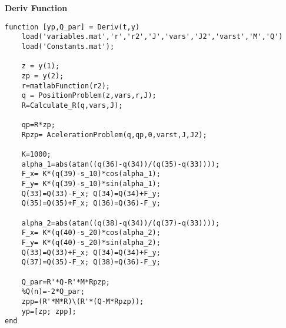 \textbf{Deriv Function}
\begin{lstlisting}[style=codematlab]
function [yp,Q_par] = Deriv(t,y)
	load('variables.mat','r','r2','J','vars','J2','varst','M','Q')
	load('Constants.mat');
	
	z = y(1);
	zp = y(2);
	r=matlabFunction(r2);
	q = PositionProblem(z,vars,r,J);
	R=Calculate_R(q,vars,J);
	
	qp=R*zp;
	Rpzp= AcelerationProblem(q,qp,0,varst,J,J2);
	
	K=1000;
	alpha_1=abs(atan((q(36)-q(34))/(q(35)-q(33))));
	F_x= K*(q(39)-s_10)*cos(alpha_1);
	F_y= K*(q(39)-s_10)*sin(alpha_1);
	Q(33)=Q(33)-F_x; Q(34)=Q(34)+F_y;
	Q(35)=Q(35)+F_x; Q(36)=Q(36)-F_y;
	
	alpha_2=abs(atan((q(38)-q(34))/(q(37)-q(33))));
	F_x= K*(q(40)-s_20)*cos(alpha_2);
	F_y= K*(q(40)-s_20)*sin(alpha_2);
	Q(33)=Q(33)+F_x; Q(34)=Q(34)+F_y;
	Q(37)=Q(35)-F_x; Q(38)=Q(36)-F_y;
	
	Q_par=R'*Q-R'*M*Rpzp;
	%Q(n)=-2*Q_par;
	zpp=(R'*M*R)\(R'*(Q-M*Rpzp));
	yp=[zp; zpp];
end
\end{lstlisting}

